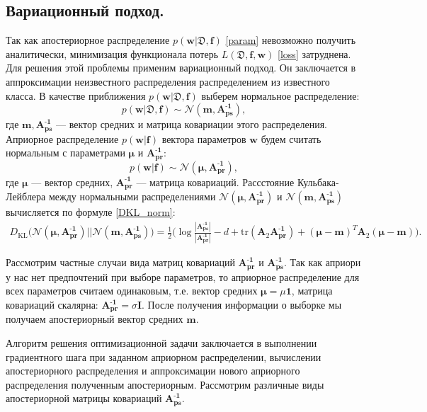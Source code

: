 \documentclass[12pt, fleqn, unicode]{article}
\newcommand{\PP}{p}
\newcommand{\DD}{{\mathfrak{D}}}
\newcommand{\NNN}{{\mathcal{N}}}
\newcommand{\bw}{{\textbf{w}}}
\newcommand{\II}{{\textbf{I}}}
\newcommand{\bbf}{{\textbf{f}}}
\newcommand{\bApr}{\mathbf{A^\text{-1}_{\text{pr}}}}
\newcommand{\bAps}{\mathbf{A^\text{-1}_{\text{ps}}}}
\newcommand{\bmupr}{\boldsymbol{\mu}}
\newcommand{\bmups}{\textbf{m}}
\newcommand{\DKL}{\mathit{D}_{\text{KL}}}
\begin{document}
\subsection{Вариационный подход.}
Так как апостериорное распределение $\PP(\bw|\DD,\bbf)$ \eqref{param} невозможно получить аналитически, минимизация функционала потерь $L(\DD,\bbf,\bw)$ \eqref{loss} затруднена. Для решения этой проблемы применим вариационный подход. Он заключается в аппроксимации неизвестного распределения распределением из известного класса.
В качестве приближения $\PP(\bw|\DD,\bbf)$ выберем нормальное распределение:
$$\PP(\bw|\DD,\bbf) \sim \NNN(\bmups,\bAps),$$
где $\bmups,\bAps$ --- вектор средних и матрица ковариации этого распределения.
Априорное распределение $\PP(\bw|\bbf)$ вектора параметров $\bw$ будем считать нормальным с параметрами $\bmupr$ и $\bApr$:
$$\PP(\bw|\bbf) \sim \NNN(\bmupr,\bApr),$$
где $\bmupr$ --- вектор средних, $\bApr$ --- матрица ковариаций.
%
Рассстояние Кульбака-Лейблера между нормальными распределениями $\NNN(\bmupr,\bApr)$ и $\NNN(\bmups,\bAps)$ вычисляется по формуле \eqref{DKL_norm}:
\begin{gather}
	\DKL\bigl(\NNN(\bmupr,\bApr)||\NNN(\bmups,\bAps)\bigr) = \frac12 \big( \log \frac{|\bAps|}{|\bApr|}-d+\text{tr}(\textbf{A}_2\bApr) + (\bmupr-\bmups)^T\textbf{A}_2(\bmupr-\bmups) \big). \label{DKL_norm}
\end{gather}

Рассмотрим частные случаи вида матриц ковариаций $\bApr$ и $\bAps$. Так как априори у нас нет предпочтений при выборе параметров, то априорное распределение для всех параметров считаем одинаковым, т.е. вектор средних $\bmupr = \mu \boldsymbol{1}$, матрица ковариаций скалярна: $\bApr = \sigma\II$.
После получения информации о выборке мы получаем апостериорный вектор средних $\bmups$.

Алгоритм решения оптимизационной задачи заключается в выполнении градиентного шага при заданном априорном распределении, вычислении апостериорного распределения и аппроксимации нового априорного распределения полученным апостериорным.
Рассмотрим различные виды апостериорной матрицы ковариаций $\bAps$.
\end{document}
